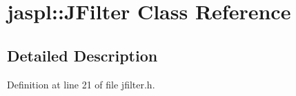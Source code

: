 \hypertarget{classjaspl_1_1_j_filter}{}\section{jaspl\+:\+:J\+Filter Class Reference}
\label{classjaspl_1_1_j_filter}


\subsection{Detailed Description}


Definition at line 21 of file jfilter.\+h.

